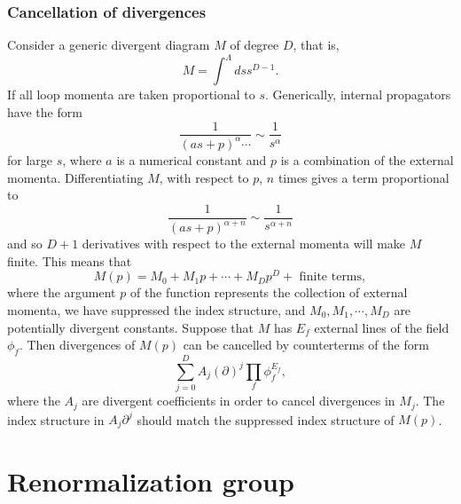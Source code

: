\subsubsection{Cancellation of divergences}
Consider a generic divergent diagram $M$ of degree $D$, that is,
\[M = \int^{\Lambda} ds s^{D-1}.\]
If all loop momenta are taken proportional to $s$. Generically, internal propagators have the form
\[\frac{1}{(as+p)^{\alpha}\cdots} \sim \frac{1}{s^{\alpha}}\]
for large $s$, where $a$ is a numerical constant and $p$ is a combination of the external momenta. Differentiating $M$, with respect to $p$, $n$ times gives a term proportional to
\[\frac{1}{(as+p)^{\alpha+n}} \sim \frac{1}{s^{\alpha + n}} \]
and so $D+1$ derivatives with respect to the external momenta will make $M$ finite. 
This means that
\[M(p) = M_0 + M_1 p + \cdots + M_D p^D + \mbox{ finite terms},\]
where the argument $p$ of the function represents the collection of external momenta, we have suppressed the index structure, and $M_0,M_1,\cdots,M_D$ are potentially divergent constants. Suppose that $M$ has $E_f$ external lines of the field $\phi_f$. Then divergences of $M(p)$ can be cancelled by counterterms of the form
\[\sum_{j=0}^D A_j (\partial)^j \prod_f \phi_f^{E_f},\]
where the $A_j$ are divergent coefficients in order to cancel divergences in $M_j$. 
The index structure in $A_j \partial^j$ should match the suppressed index structure of $M(p)$.

\section{Renormalization group}
